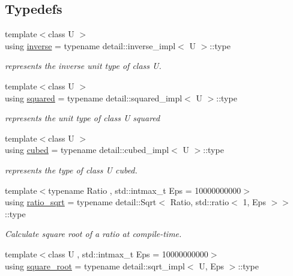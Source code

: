 \subsection*{Typedefs}
\begin{DoxyCompactItemize}
\item 
{\footnotesize template$<$class U $>$ }\\using \hyperlink{group___unit_manipulators_gaacc539ef162e24b260d023d3ff949b57}{inverse} = typename detail\+::inverse\+\_\+impl$<$ U $>$\+::type
\begin{DoxyCompactList}\small\item\em represents the inverse unit type of {\ttfamily class U}. \end{DoxyCompactList}\item 
{\footnotesize template$<$class U $>$ }\\using \hyperlink{group___unit_manipulators_ga636346f7898c35eb98a796bec1d77fb2}{squared} = typename detail\+::squared\+\_\+impl$<$ U $>$\+::type
\begin{DoxyCompactList}\small\item\em represents the unit type of {\ttfamily class U} squared \end{DoxyCompactList}\item 
{\footnotesize template$<$class U $>$ }\\using \hyperlink{group___unit_manipulators_gad3e94dc693fe45a580b382cb666434a1}{cubed} = typename detail\+::cubed\+\_\+impl$<$ U $>$\+::type
\begin{DoxyCompactList}\small\item\em represents the type of {\ttfamily class U} cubed. \end{DoxyCompactList}\item 
{\footnotesize template$<$typename Ratio , std\+::intmax\+\_\+t Eps = 10000000000$>$ }\\using \hyperlink{group___type_traits_ga62dd90a825a801e3e29841ed51713693}{ratio\+\_\+sqrt} = typename detail\+::\+Sqrt$<$ Ratio, std\+::ratio$<$ 1, Eps $>$$>$\+::type
\begin{DoxyCompactList}\small\item\em Calculate square root of a ratio at compile-\/time. \end{DoxyCompactList}\item 
{\footnotesize template$<$class U , std\+::intmax\+\_\+t Eps = 10000000000$>$ }\\using \hyperlink{group___unit_manipulators_ga66c5d3d0e80c7c3e56683d7df366b380}{square\+\_\+root} = typename detail\+::sqrt\+\_\+impl$<$ U, Eps $>$\+::type
$$
\end{DoxyCompactItemize}
